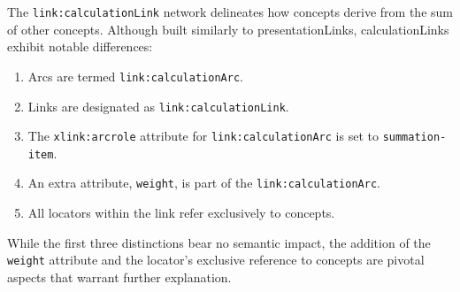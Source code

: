 

The \texttt{link:calculationLink} network delineates how concepts derive from the sum of other concepts.  
Although built similarly to presentationLinks, calculationLinks exhibit notable differences:  

\begin{enumerate}  
    \item Arcs are termed \texttt{link:calculationArc}.  
    \item Links are designated as \texttt{link:calculationLink}.  
    \item The \texttt{xlink:arcrole} attribute for \texttt{link:calculationArc} is set to \texttt{summation-item}.  
    \item An extra attribute, \texttt{weight}, is part of the \texttt{link:calculationArc}.  
    \item All locators within the link refer exclusively to concepts.  
\end{enumerate}  

While the first three distinctions bear no semantic impact,  
the addition of the \texttt{weight} attribute and the locator's exclusive reference to concepts are pivotal aspects that warrant further explanation.



